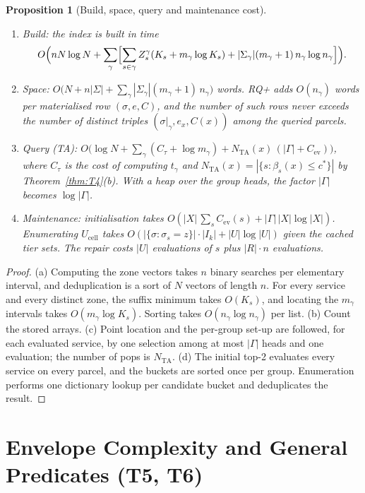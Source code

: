 \documentclass[11pt]{article}
\newtheorem{proposition}[theorem]{Proposition}
\theoremstyle{definition}
\theoremstyle{remark}
\begin{document}
\begin{proposition}[Build, space, query and maintenance cost]\label{prop:complexity}
\begin{enumerate}[label=(\alph*)]
\item \emph{Build:} the index is built in time
\[
O\Bigl(nN\log N+\sum_\gamma\Bigl[\sum_{s\in\gamma}Z^\gamma_s(K_s+m_\gamma\log K_s)+|\Sigma_\gamma|(m_\gamma+1)\,n_\gamma\log n_\gamma\Bigr]\Bigr).
\]
\item \emph{Space:} $O\bigl(N+n|\Sigma|+\sum_\gamma|\Sigma_\gamma|(m_\gamma+1)\,n_\gamma\bigr)$ words. RQ+ adds
$O(n_\gamma)$ words per materialised row $(\sigma,e,C)$, and the number of such rows never
exceeds the number of distinct triples $(\sigma|_\gamma,e_x,C(x))$ among the queried parcels.
\item \emph{Query (TA):} $O\bigl(\log N+\sum_\gamma(C_\tau+\log m_\gamma)+N_{\mathrm{TA}}(x)\,(|\Gamma|+C_{\mathrm{ev}})\bigr)$,
where $C_\tau$ is the cost of computing $t_\gamma$ and $N_{\mathrm{TA}}(x)=|\{s:\beta_s(x)\le c^*\}|$ by
Theorem~\ref{thm:T4}(b). With a heap over the group heads, the factor $|\Gamma|$ becomes
$\log|\Gamma|$.
\item \emph{Maintenance:} initialisation takes $O(|X|\,\sum_sC_{\mathrm{ev}}(s)+|\Gamma|\,|X|\log|X|)$.
Enumerating $U_{\mathrm{cell}}$ takes $O(|\{\sigma:\sigma_s=z\}|\cdot|I_k|+|U|\log|U|)$ given the
cached tier sets. The repair costs $|U|$ evaluations of $s$ plus $|R|\cdot n$ evaluations.
\end{enumerate}
\end{proposition}
\begin{proof}
(a) Computing the zone vectors takes $n$ binary searches per elementary interval, and
deduplication is a sort of $N$ vectors of length $n$. For every service and every distinct
zone, the suffix minimum takes $O(K_s)$, and locating the $m_\gamma$ intervals takes
$O(m_\gamma\log K_s)$. Sorting takes $O(n_\gamma\log n_\gamma)$ per list.
(b) Count the stored arrays.
(c) Point location and the per-group set-up are followed, for each evaluated service, by
one selection among at most $|\Gamma|$ heads and one evaluation; the number of pops is
$N_{\mathrm{TA}}$.
(d) The initial top-2 evaluates every service on every parcel, and the buckets are sorted
once per group. Enumeration performs one dictionary lookup per candidate bucket and
deduplicates the result.
\end{proof}

\section{Envelope Complexity and General Predicates (T5, T6)}\label{sec:T5T6}
\end{document}
